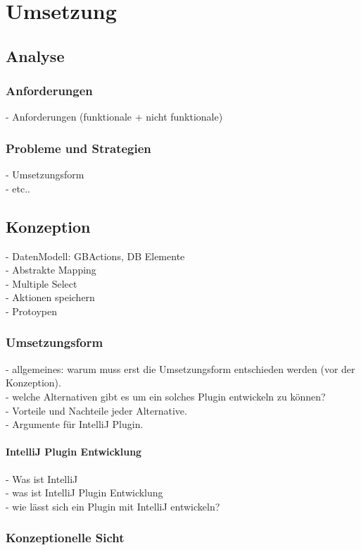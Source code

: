 \chapter{Umsetzung}
\section{Analyse}
\subsection{Anforderungen}
- Anforderungen (funktionale + nicht funktionale)\\

\subsection{Probleme und Strategien}
- Umsetzungsform\\
- etc..
\section{Konzeption}
- DatenModell: GBActions, DB Elemente\\
- Abstrakte Mapping \\
- Multiple Select \\
- Aktionen speichern \\
- Protoypen \\
\subsection{Umsetzungsform}
- allgemeines: warum muss erst die Umsetzungsform entschieden werden (vor der Konzeption). \\
- welche Alternativen gibt es um ein solches Plugin entwickeln zu können?\\
- Vorteile und Nachteile jeder Alternative.\\
- Argumente für IntelliJ Plugin.
\subsubsection{IntelliJ Plugin Entwicklung}
- Was ist IntelliJ \\
- was ist IntelliJ Plugin Entwicklung \\
- wie lässt sich ein Plugin mit IntelliJ entwickeln?\\

\subsection{Konzeptionelle Sicht}
